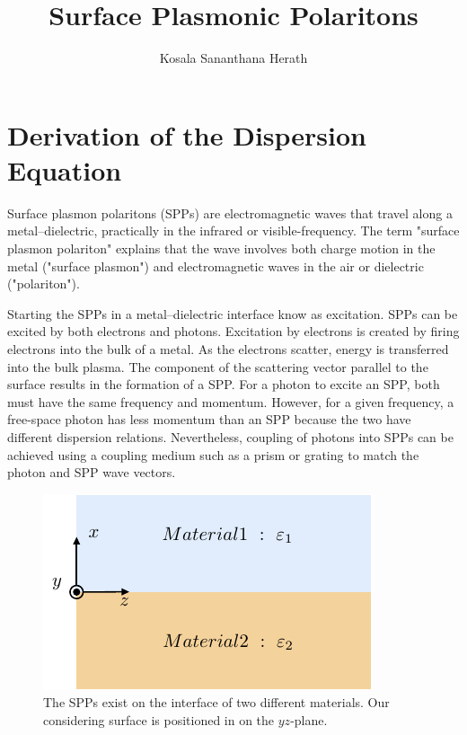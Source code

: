\documentclass[a4paper]{article}
\title{Surface Plasmonic Polaritons}
\author{Kosala Sananthana Herath}
\numberwithin{equation}{subsection}
\numberwithin{equation}{section}
\begin{document}
\maketitle

\section{Derivation of the Dispersion Equation}

Surface plasmon polaritons (SPPs) are electromagnetic waves that travel along a metal–dielectric, practically in the infrared or visible-frequency. The term "surface plasmon polariton" explains that the wave involves both charge motion in the metal ("surface plasmon") and electromagnetic waves in the air or dielectric ("polariton").

Starting the SPPs in a metal–dielectric interface know as excitation. SPPs can be excited by both electrons and photons. Excitation by electrons is created by firing electrons into the bulk of a metal. As the electrons scatter, energy is transferred into the bulk plasma. The component of the scattering vector parallel to the surface results in the formation of a SPP. For a photon to excite an SPP, both must have the same frequency and momentum. However, for a given frequency, a free-space photon has less momentum than an SPP because the two have different dispersion relations. Nevertheless, coupling of photons into SPPs can be achieved using a coupling medium such as a prism or grating to match the photon and SPP wave vectors.
\begin{figure}[ht!]
  \centering
  \includegraphics{figures/fig1}
  \caption{The SPPs exist on the interface of two different materials. Our considering surface is positioned in on the $yz$-plane.}
  \label{fig1}
\end{figure}
\end{document}
